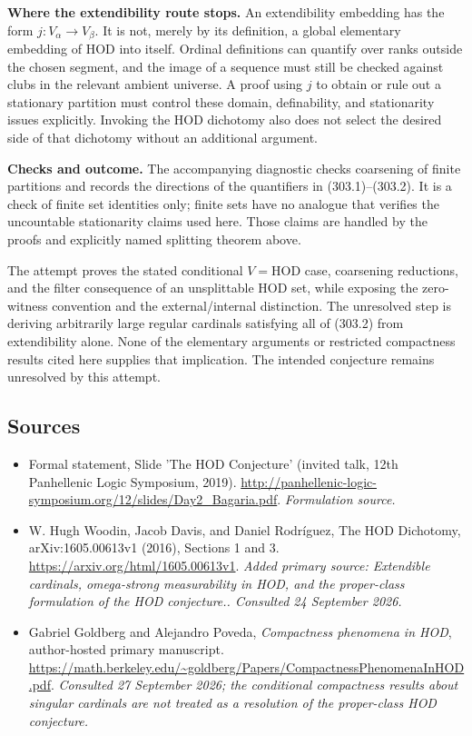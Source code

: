 \documentclass[11pt]{article}
\begin{document}
\textbf{Where the extendibility route stops.} An extendibility embedding has the form $j:V_\alpha\to V_\beta$. It is not, merely by its definition, a global elementary embedding of HOD into itself. Ordinal definitions can quantify over ranks outside the chosen segment, and the image of a sequence must still be checked against clubs in the relevant ambient universe. A proof using $j$ to obtain or rule out a stationary partition must control these domain, definability, and stationarity issues explicitly. Invoking the HOD dichotomy also does not select the desired side of that dichotomy without an additional argument.

\textbf{Checks and outcome.} The accompanying diagnostic checks coarsening of finite partitions and records the directions of the quantifiers in (303.1)--(303.2). It is a check of finite set identities only; finite sets have no analogue that verifies the uncountable stationarity claims used here. Those claims are handled by the proofs and explicitly named splitting theorem above.

The attempt proves the stated conditional $V=\mathrm{HOD}$ case, coarsening reductions, and the filter consequence of an unsplittable HOD set, while exposing the zero-witness convention and the external/internal distinction. The unresolved step is deriving arbitrarily large regular cardinals satisfying all of (303.2) from extendibility alone. None of the elementary arguments or restricted compactness results cited here supplies that implication. The intended conjecture remains unresolved by this attempt.

\subsection{Sources}
\begin{itemize}
\item[S1]Formal statement, Slide 'The HOD Conjecture' (invited talk, 12th Panhellenic Logic Symposium, 2019).
\url{http://panhellenic-logic-symposium.org/12/slides/Day2_Bagaria.pdf}.
\textit{Formulation source.}
\item[E1]W. Hugh Woodin, Jacob Davis, and Daniel Rodríguez, The HOD Dichotomy, arXiv:1605.00613v1 (2016), Sections 1 and 3.
\url{https://arxiv.org/html/1605.00613v1}.
\textit{Added primary source: Extendible cardinals, omega-strong measurability in HOD, and the proper-class formulation of the HOD conjecture.. Consulted 24 September 2026.}
\item[E2]Gabriel Goldberg and Alejandro Poveda, \emph{Compactness phenomena in HOD}, author-hosted primary manuscript.
\url{https://math.berkeley.edu/~goldberg/Papers/CompactnessPhenomenaInHOD.pdf}.
\textit{Consulted 27 September 2026; the conditional compactness results about singular cardinals are not treated as a resolution of the proper-class HOD conjecture.}
\end{itemize}
\end{document}

